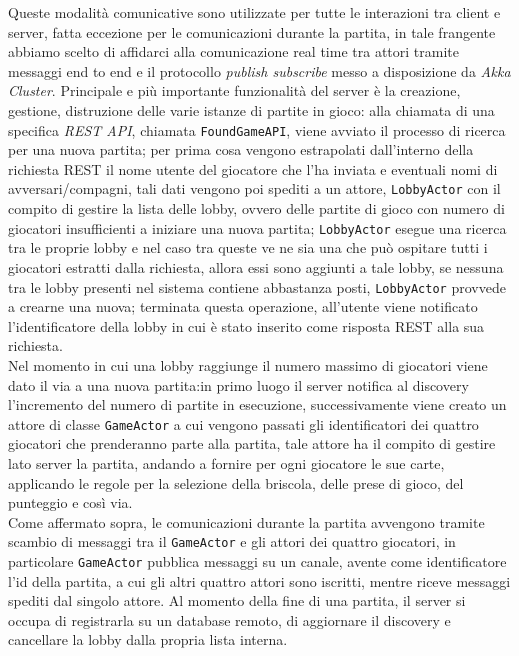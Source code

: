  Queste modalità comunicative sono utilizzate per tutte le interazioni tra client e server, fatta eccezione per le comunicazioni durante la partita, in tale frangente abbiamo scelto di affidarci alla comunicazione real time tra attori tramite messaggi end to end e il protocollo \textit{publish subscribe} messo a disposizione da \textit{Akka Cluster}.
 Principale e più importante funzionalità del server è la creazione, gestione, distruzione delle varie istanze di partite in gioco:
 alla chiamata di una specifica \textit{REST API}, chiamata \texttt{FoundGameAPI}, viene avviato il processo di ricerca per una nuova partita; per prima cosa vengono estrapolati dall'interno della richiesta REST il nome utente del giocatore che l'ha inviata e eventuali nomi di avversari/compagni, tali dati vengono poi spediti a un attore, \texttt{LobbyActor} con il compito di gestire la lista delle lobby, ovvero delle partite di gioco con numero di giocatori insufficienti a iniziare una nuova partita; \texttt{LobbyActor} esegue una ricerca tra le proprie lobby e  nel caso tra queste ve ne sia una che può ospitare tutti i giocatori estratti dalla richiesta, allora essi sono aggiunti a tale lobby, se nessuna tra le lobby presenti nel sistema contiene abbastanza posti, \texttt{LobbyActor} provvede a crearne una nuova; terminata questa operazione, all'utente viene notificato l'identificatore della lobby in cui è stato inserito come risposta REST alla sua richiesta. \\
 Nel momento in cui una lobby raggiunge il numero massimo di giocatori viene dato il via a una nuova partita:in primo luogo il server notifica al discovery l'incremento del numero di partite in esecuzione, successivamente viene creato un attore di classe \texttt{GameActor} a cui vengono passati gli identificatori dei quattro giocatori che prenderanno parte alla partita, tale attore ha il compito di gestire lato server la partita, andando a fornire per ogni giocatore le sue carte, applicando le regole per la selezione della briscola, delle prese di gioco, del punteggio e così via.\\
 Come affermato sopra, le comunicazioni durante la partita avvengono tramite scambio di messaggi tra il \texttt{GameActor} e gli attori dei quattro giocatori, in particolare \texttt{GameActor} pubblica messaggi su un canale, avente come identificatore l'id della partita, a cui gli altri quattro attori sono iscritti, mentre riceve messaggi spediti dal singolo attore.
 Al momento della fine di una partita, il server si occupa di registrarla su un database remoto, di aggiornare il discovery e cancellare la lobby dalla propria lista interna.\\
